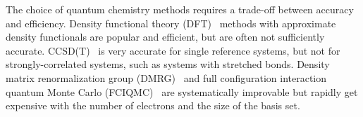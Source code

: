 \documentclass[%
reprint,
 superscriptaddress,
 amsmath,amssymb,
 aps,
]{revtex4-1}
\begin{document}
The choice of quantum chemistry methods requires a trade-off between accuracy and efficiency.
Density functional theory
(DFT)~\cite{ParYan-BOOK-89,DreGro-BOOK-90,kohn1999nobel}
methods with approximate density functionals
are popular and efficient, but are often not sufficiently accurate.  CCSD(T)~\cite{raghavachari1989fifth} is very accurate for single reference systems, but
not for strongly-correlated systems, such as systems with stretched bonds.
Density matrix renormalization group (DMRG)~\cite{white1993density,white1999ab,chan2002highly,chan2011density,ShaCha-JCP-12,olivares2015ab,schollwock2005density,GuoLiCha-JCTC-18}
and full configuration interaction quantum Monte Carlo (FCIQMC)~\cite{BooThoAla-JCP-09,CleBooAla-JCP-10,PetHolChaNigUmr-PRL-12,BooGruKreAla-Nat-13,HolChaUmr-JCTC-16}
are systematically improvable but rapidly get expensive with the number of electrons and the size of the basis set.

\end{document}
